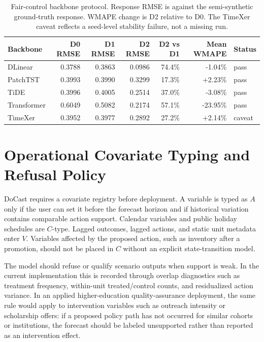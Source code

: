 \documentclass[11pt]{article}
\begin{document}
\begin{table}[t]
\centering
\caption{Fair-control backbone protocol. Response RMSE is against the
semi-synthetic ground-truth response. WMAPE change is D2 relative to D0. The
TimeXer caveat reflects a seed-level stability failure, not a missing run.}
\label{tab:backbones}
\begin{tabular}{lrrrrrl}
\toprule
Backbone & D0 RMSE & D1 RMSE & D2 RMSE & D2 vs D1 & Mean WMAPE & Status \\
\midrule
DLinear & 0.3788 & 0.3863 & 0.0986 & 74.4\% & -1.04\% & pass \\
PatchTST & 0.3993 & 0.3990 & 0.3299 & 17.3\% & +2.23\% & pass \\
TiDE & 0.3996 & 0.4005 & 0.2514 & 37.0\% & -3.08\% & pass \\
Transformer & 0.6049 & 0.5082 & 0.2174 & 57.1\% & -23.95\% & pass \\
TimeXer & 0.3952 & 0.3977 & 0.2892 & 27.2\% & +2.14\% & caveat \\
\bottomrule
\end{tabular}
\end{table}

\section{Operational Covariate Typing and Refusal Policy}

DoCast requires a covariate registry before deployment. A variable is typed as
$A$ only if the user can set it before the forecast horizon and if historical
variation contains comparable action support. Calendar variables and public
holiday schedules are $C$-type. Lagged outcomes, lagged actions, and static unit
metadata enter $V$. Variables affected by the proposed action, such as
inventory after a promotion, should not be placed in $C$ without an explicit
state-transition model.

The model should refuse or qualify scenario outputs when support is weak. In
the current implementation this is recorded through overlap diagnostics such as
treatment frequency, within-unit treated/control counts, and residualized action
variance. In an applied higher-education quality-assurance deployment, the same
rule would apply to intervention variables such as outreach intensity or
scholarship offers: if a proposed policy path has not occurred for similar
cohorts or institutions, the forecast should be labeled unsupported rather than
reported as an intervention effect.
\end{document}
